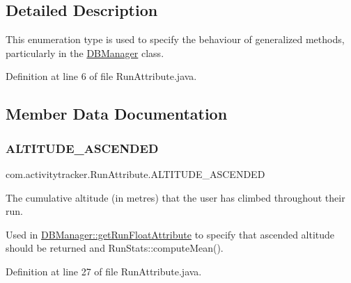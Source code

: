 \subsection{Detailed Description}
This enumeration type is used to specify the behaviour of generalized methods, particularly in the \mbox{\hyperlink{classcom_1_1activitytracker_1_1_d_b_manager}{D\+B\+Manager}} class. 

Definition at line 6 of file Run\+Attribute.\+java.



\subsection{Member Data Documentation}
\mbox{\label{enumcom_1_1activitytracker_1_1_run_attribute_abcfe85bf48187d67842a0525c1bcc0af}} 
\subsubsection{\texorpdfstring{A\+L\+T\+I\+T\+U\+D\+E\+\_\+\+A\+S\+C\+E\+N\+D\+ED}{ALTITUDE\_ASCENDED}}
{\footnotesize\ttfamily com.\+activitytracker.\+Run\+Attribute.\+A\+L\+T\+I\+T\+U\+D\+E\+\_\+\+A\+S\+C\+E\+N\+D\+ED}

The cumulative altitude (in metres) that the user has climbed throughout their run.

Used in \mbox{\hyperlink{classcom_1_1activitytracker_1_1_d_b_manager_a666452f1e5862f90c06b0beb9a9fcfdd}{D\+B\+Manager\+::get\+Run\+Float\+Attribute}} to specify that ascended altitude should be returned and Run\+Stats\+::compute\+Mean(). 

Definition at line 27 of file Run\+Attribute.\+java.

\mbox{\label{enumcom_1_1activitytracker_1_1_run_attribute_a337a68867cfdb8ec7a17c318ad8b216b}} 
